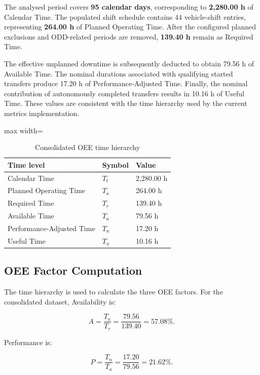 The analysed period covers \textbf{95 calendar days}, corresponding to \textbf{2,280.00 h} of Calendar Time. The populated shift schedule contains 44 vehicle-shift entries, representing \textbf{264.00 h} of Planned Operating Time. After the configured planned exclusions and ODD-related periods are removed, \textbf{139.40 h} remain as Required Time.

The effective unplanned downtime is subsequently deducted to obtain 79.56 h of Available Time. The nominal durations associated with qualifying started transfers produce 17.20 h of Performance-Adjusted Time. Finally, the nominal contribution of autonomously completed transfers results in 10.16 h of Useful Time. These values are consistent with the time hierarchy used by the current metrics implementation.

\begin{table}[htbp]
\small
\renewcommand{\arraystretch}{1.3}
\centering
\caption{Consolidated OEE time hierarchy}
\label{tab:consolidated-oee-time-hierarchy}
\begin{adjustbox}{max width=\textwidth}
\begin{tabular}{|p{4.5cm}|p{2.0cm}|p{3.0cm}|}
\hline
\textbf{Time level} & \textbf{Symbol} & \textbf{Value} \\
\hline
Calendar Time & $T_t$ & 2,280.00 h \\
\hline
Planned Operating Time & $T_o$ & 264.00 h \\
\hline
Required Time & $T_r$ & 139.40 h \\
\hline
Available Time & $T_a$ & 79.56 h \\
\hline
Performance-Adjusted Time & $T_n$ & 17.20 h \\
\hline
Useful Time & $T_u$ & 10.16 h \\
\hline
\end{tabular}
\end{adjustbox}
\end{table}
\subsection{OEE Factor Computation}
\label{subsec:oee-factor-computation}
The time hierarchy is used to calculate the three OEE factors. For the consolidated dataset, Availability is:

$$
A = \frac{T_a}{T_r} = \frac{79.56}{139.40} = 57.08\%.
$$

Performance is:

$$
P = \frac{T_n}{T_a} = \frac{17.20}{79.56} = 21.62\%.
$$

